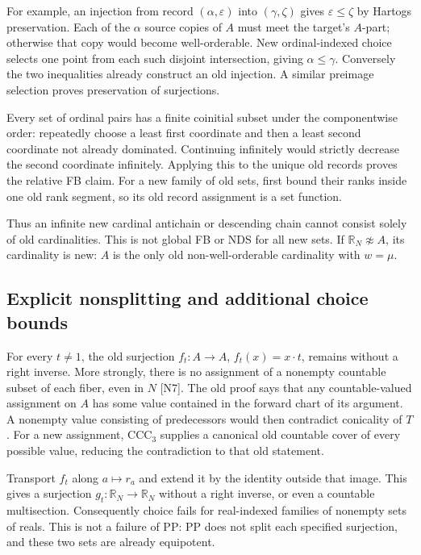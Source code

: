For example, an injection from record $(\alpha,\varepsilon)$ into
$(\gamma,\zeta)$ gives $\varepsilon\leq\zeta$ by Hartogs preservation.
Each of the $\alpha$ source copies of $A$ must meet the target's
$A$-part; otherwise that copy would become well-orderable.  New
ordinal-indexed choice selects one point from each such disjoint
intersection, giving $\alpha\leq\gamma$.  Conversely the two
inequalities already construct an old injection.  A similar
preimage selection proves preservation of surjections.

Every set of ordinal pairs has a finite coinitial subset under the
componentwise order: repeatedly choose a least first coordinate and
then a least second coordinate not already dominated.  Continuing
infinitely would strictly decrease the second coordinate infinitely.
Applying this to the unique old records proves the relative FB claim.
For a new family of old sets, first bound their ranks inside one old
rank segment, so its old record assignment is a set function.

Thus an infinite new cardinal antichain or descending chain cannot
consist solely of old cardinalities.  This is not global FB or NDS
for all new sets.  If $\mathbb R_N\not\approx A$, its cardinality is
new: $A$ is the only old non-well-orderable cardinality with
$w=\mu$.

\subsection{Explicit nonsplitting and additional choice bounds}

For every $t\neq1$, the old surjection $f_t:A\to A$,
$f_t(x)=x\cdot t$, remains without a right inverse.  More strongly,
there is no assignment of a nonempty countable subset of each fiber,
even in $N$ [N7].  The old proof says that any countable-valued
assignment on $A$ has some value contained in the forward chart of
its argument.  A nonempty value consisting of predecessors would
then contradict conicality of $T$.  For a new assignment,
$\mathrm{CCC}_3$ supplies a canonical old countable cover of every
possible value, reducing the contradiction to that old statement.

Transport $f_t$ along $a\mapsto r_a$ and extend it by the identity
outside that image.  This gives a surjection
$g_t:\mathbb R_N\to\mathbb R_N$ without a right inverse, or even a
countable multisection.  Consequently choice fails for real-indexed
families of nonempty sets of reals.  This is not a failure of PP:
PP does not split each specified surjection, and these two sets are
already equipotent.

